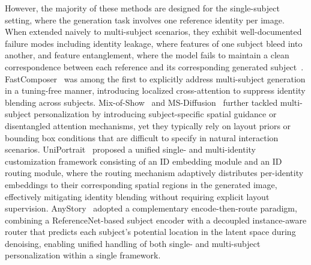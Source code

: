 \documentclass{article}
\begin{document}
However, the majority of these methods are designed for the single-subject setting, where the generation task involves one reference identity per image. When extended naively to multi-subject scenarios, they exhibit well-documented failure modes including identity leakage, where features of one subject bleed into another, and feature entanglement, where the model fails to maintain a clean correspondence between each reference and its corresponding generated subject~\cite{xiao2023fastcomposer, wang2024ms, she2025mosaic}. FastComposer~\cite{xiao2023fastcomposer} was among the first to explicitly address multi-subject generation in a tuning-free manner, introducing localized cross-attention to suppress identity blending across subjects. Mix-of-Show~\cite{gu2024mix} and MS-Diffusion~\cite{wang2024ms} further tackled multi-subject personalization by introducing subject-specific spatial guidance or disentangled attention mechanisms, yet they typically rely on layout priors or bounding box conditions that are difficult to specify in natural interaction scenarios. UniPortrait~\cite{he2024uniportrait} proposed a unified single- and multi-identity customization framework consisting of an ID embedding module and an ID routing module, where the routing mechanism adaptively distributes per-identity embeddings to their corresponding spatial regions in the generated image, effectively mitigating identity blending without requiring explicit layout supervision. AnyStory~\cite{he2025anystory} adopted a complementary encode-then-route paradigm, combining a ReferenceNet-based subject encoder with a decoupled instance-aware router that predicts each subject's potential location in the latent space during denoising, enabling unified handling of both single- and multi-subject personalization within a single framework.
\end{document}
